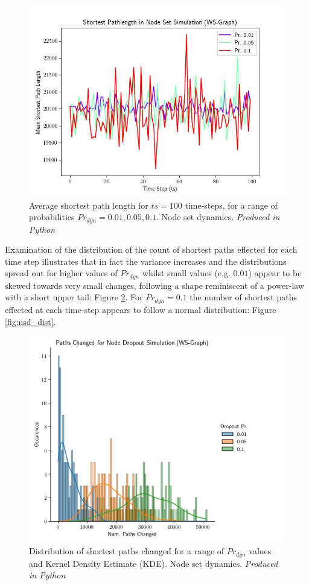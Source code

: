 \documentclass[
	a4paper, %
	10pt, %
	unnumberedsections, %
	twoside, %
]{LTJournalArticle}
\begin{document}
\begin{figure}[H]
	\includegraphics[width=\linewidth]{Figures/nsd/NS_ex3_avg_length.jpg}
	\caption{Average shortest path length for \(ts = 100\) time-steps, for a range of probabilities \(Pr_{dyn} = 0.01, 0.05, 0.1\). Node set dynamics. \emph{Produced in Python}}
	\label{fig:nsd_lengths}
\end{figure}

Examination of the distribution of the count of shortest paths effected for each time step illustrates that in fact the variance increases and the distributions spread out for higher values of \(Pr_{dyn}\) whilst small values (e.g. \(0.01\)) appear to be skewed towards very small changes, following a shape reminiscent of a power-law with a short upper tail: Figure \ref{fig:nsd_dist_prob}. For \(Pr_{dyn} = 0.1\) the number of shortest paths effected at each time-step appears to follow a normal distribution: Figure \ref{fig:nsd_dist}. 

\begin{figure}[H]
	\includegraphics[width=\linewidth]{Figures/nsd/paths_prob_dist.jpg}
	\caption{Distribution of shortest paths changed for a range of \(Pr_{dyn}\) values and Kernel Density Estimate (KDE). Node set dynamics. \emph{Produced in Python}}
	\label{fig:nsd_dist_prob}
\end{figure}
\end{document}
